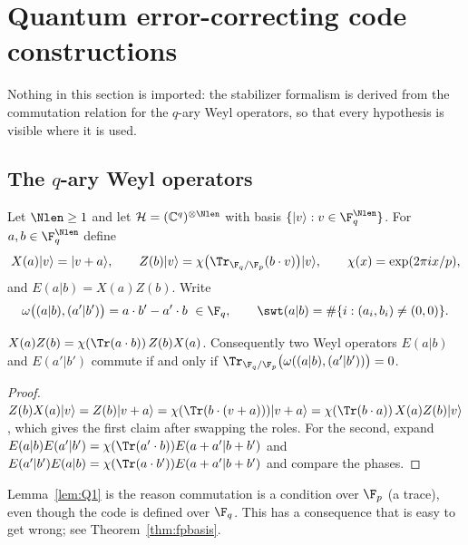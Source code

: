 \section{Quantum error-correcting code constructions}
\label{sec:quantum}

Nothing in this section is imported: the stabilizer formalism is derived from
the commutation relation for the $q$-ary Weyl operators, so that every
hypothesis is visible where it is used.

\subsection{The \texorpdfstring{$q$}{q}-ary Weyl operators}

Let $\Nlen\ge1$ and let $\mathcal H=(\mathbb C^q)^{\otimes\Nlen}$ with basis
$\{|v\rangle:v\in\F_q^{\Nlen}\}$. For $a,b\in\F_q^{\Nlen}$ define
\begin{equation}\label{eq:weyl}
  X(a)|v\rangle=|v+a\rangle,\qquad
  Z(b)|v\rangle=\chi\bigl(\Tr_{\F_q/\F_p}(b\cdot v)\bigr)|v\rangle,
  \qquad \chi(x)=\exp(2\pi i x/p),
\end{equation}
and $E(a|b)=X(a)Z(b)$. Write
\begin{equation}\label{eq:omega}
  \omega\bigl((a|b),(a'|b')\bigr)=a\cdot b'-a'\cdot b\ \in\F_q,
  \qquad
  \swt(a|b)=\#\{i:(a_i,b_i)\ne(0,0)\}.
\end{equation}

\begin{lemma}[commutation]\label{lem:Q1}
$X(a)Z(b)=\chi(\Tr(a\cdot b))\,Z(b)X(a)$. Consequently two Weyl operators
$E(a|b)$ and $E(a'|b')$ commute if and only if
$\Tr_{\F_q/\F_p}\bigl(\omega((a|b),(a'|b'))\bigr)=0$.
\end{lemma}

\begin{proof}
$Z(b)X(a)|v\rangle=Z(b)|v+a\rangle
=\chi(\Tr(b\cdot(v+a)))|v+a\rangle
=\chi(\Tr(b\cdot a))\,X(a)Z(b)|v\rangle$, which gives the first claim after
swapping the roles. For the second, expand
$E(a|b)E(a'|b')=\chi(\Tr(a'\cdot b))E(a+a'|b+b')$ and
$E(a'|b')E(a|b)=\chi(\Tr(a\cdot b'))E(a+a'|b+b')$ and compare the phases.
\end{proof}

Lemma~\ref{lem:Q1} is the reason commutation is a condition over $\F_p$ (a
trace), even though the code is defined over $\F_q$. This has a consequence that
is easy to get wrong; see Theorem~\ref{thm:fpbasis}.

